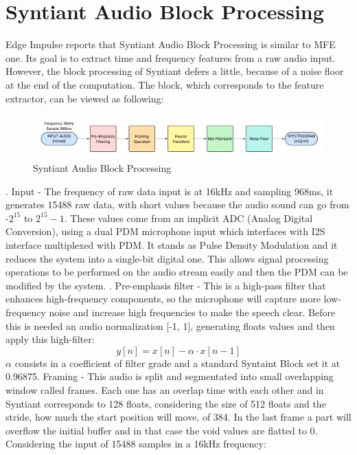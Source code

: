 \section{Syntiant Audio Block Processing}
\label{sec:audio}
Edge Impulse reports that Syntiant Audio Block Processing is similar to MFE one\cite{syntiant_audio_block}. Its goal is to extract time and frequency features from a raw audio input. However, the block processing of Syntiant defers a little, because of a noise floor at the end of the computation. The block, which corresponds to the feature extractor, can be viewed as following:
\begin{figure}[!h]
    \centering
    \includegraphics[width=1.0\textwidth]{images/2.03 MFE Block Processing.png}
    \caption{Syntiant Audio Block Processing}
\end{figure}. Input - The frequency of raw data input is at 16kHz and sampling 968ms, it generates 15488 raw data, with short values because the audio sound can go from -$2^{15}$ to $2^{15}-1$. These values come from an implicit ADC (Analog Digital Conversion), using a dual PDM microphone input which interfaces with I2S interface multiplexed with PDM\cite{PDM_module}. It stands as Pulse Density Modulation and it reduces the system into a single-bit digital one. This allows signal processing operations to be performed on the audio stream easily and then the PDM can be modified by the system.  . Pre-emphasis filter - This is a high-pass filter that enhances high-frequency components, so the microphone will capture more low-frequency noise and increase high frequencies to make the speech clear. Before this is needed an audio normalization [-1, 1], generating floats values and then apply this high-filter:
\begin{equation}
    y[n]=x[n]-\alpha\cdot x[n-1]
\end{equation}
$\alpha$ consists in a coefficient of filter grade and a standard Syntaint Block set it at 0.96875. Framing - This audio is split and segmentated into small overlapping window called frames. Each one has an overlap time with each other and in Syntiant corresponds to 128 floats, considering the size of 512 floats and the stride, how much the start position will move, of 384. In the last frame a part will overflow the initial buffer and in that case the void values are flatted to 0. Considering the input of 15488 samples in a 16kHz frequency:\newline
